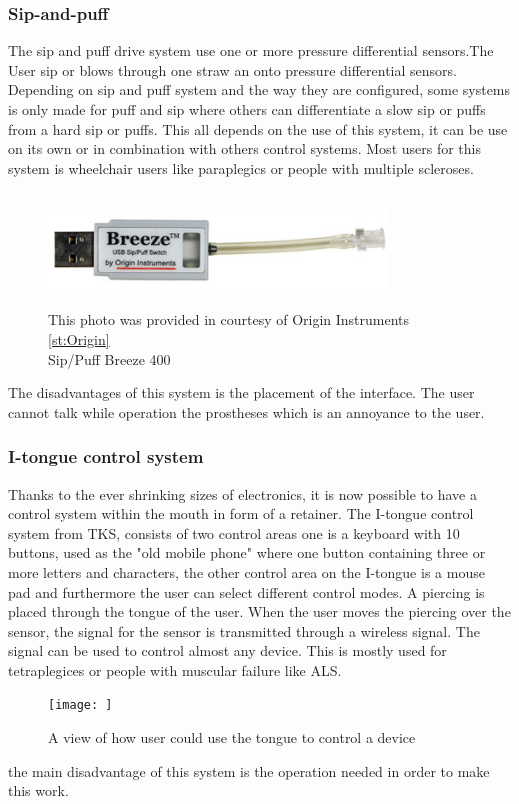\subsubsection*{Sip-and-puff}
The sip and puff drive system use one or more pressure differential sensors.The User sip or blows through one straw an onto pressure differential sensors. Depending on sip and puff system and the way they are configured, some systems is only made for puff and sip where others can differentiate a slow sip or puffs from a hard sip or puffs. This all depends on the use of this system, it can be use on its own or in combination with others control systems\cite{Snp}. Most users for this system is wheelchair users like paraplegics or people with multiple scleroses.\\
\begin{figure}[H]
    \centering
    \includegraphics[width=9cm,height=3cm]{Figures/Contextual_figures/breeze_400.jpg}
    \caption{This photo was provided in courtesy of Origin Instruments \ref{st:Origin}\\ 
    Sip/Puff Breeze 400\cite{Snp}}
    \label{fig:Sip/Puff}
\end{figure}
The disadvantages of this system is the placement of the interface. The user cannot talk while operation the prostheses which is an annoyance to the user. 
\subsubsection*{I-tongue control system}
Thanks to the ever shrinking sizes of electronics, it is now possible to have a control system within the mouth in form of a retainer. The I-tongue control system from TKS\cite{TKS}, consists of two control areas one is a keyboard with 10 buttons, used as the "old mobile phone" where one button containing three or more letters and characters, the other control area on the I-tongue is a mouse pad and furthermore the user can select different control modes. A piercing is placed through the tongue of the user. When the user moves the piercing over the sensor, the signal for the sensor is transmitted through a wireless signal. The signal can be used to control almost any device. This is mostly used for tetraplegices or people with muscular failure like ALS\cite{TDSp}.\\
\begin{figure}[H]
    \centering
    \texttt{[image: ]}
    \caption{A view of how user could use the tongue to control a device\cite{TDSp}}
    \label{fig:TDS}
\end{figure}
the main disadvantage of this system is the operation needed in order to make this work. 
